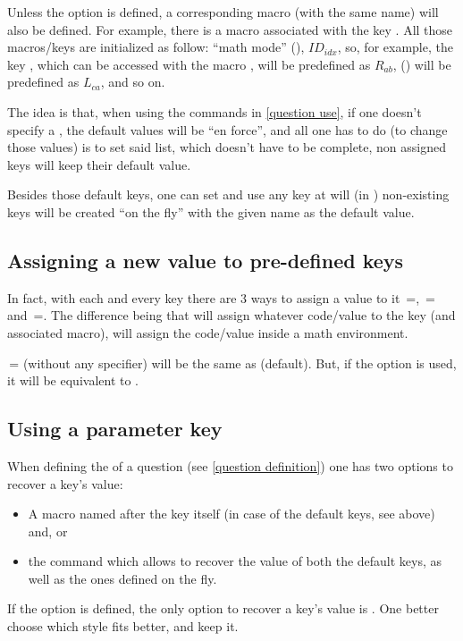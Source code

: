\documentclass[10pt]{article}
\begin{document}
Unless the  option is defined, a corresponding macro (with the same name) will also be defined. For example, there is a macro \tsobj{\Ra} associated with the key .
All those macros/keys are initialized  as follow: ``math mode'' (\tsobj{\ensuremath}), $ID_{idx}$, so, for example, the key , which can be accessed with the macro \tsobj{\Rab},  will be predefined as $R_{ab}$,  (\tsobj{\Lca}) will be predefined as $L_{ca}$, and so on.

The idea is that, when using the commands in \ref{question use}, if one doesn't specify a , the default values will be ``en force'', and all one has to do (to change those values) is to set said list, which doesn't have to be complete, non assigned keys will keep their default value.

Besides those default keys, one can set and use any key at will (in ) non-existing keys will be created ``on the fly'' with the given name as the default value.

\subsection{Assigning a new value to pre-defined keys}
In fact, with each and every key there are 3 ways to assign a value to it \,=, \,= and \,=. The difference being that  will assign whatever code/value to the key (and associated macro),  will assign the code/value inside a math environment. 
\begin{tsremark}
\,= (without any specifier) will be the same as  (default). But, if the option  is used, it will be equivalent to .
\end{tsremark}

\subsection{Using a parameter key}
When defining the  of a question (see \ref{question definition}) one has two options to recover a key's value:
\begin{itemize}
  \item A macro named after the key itself (in case of the default keys, see above) and, or
  \item the \tsobj{\QuestVal} command which allows to recover the value of both the default keys, as well as the ones defined on the fly.
\end{itemize}
\begin{tsremark}
If the option  is defined, the only option to recover a key's value is \tsobj{\QuestVal}. One better choose which style fits better, and keep it.
\end{tsremark}
\end{document}
